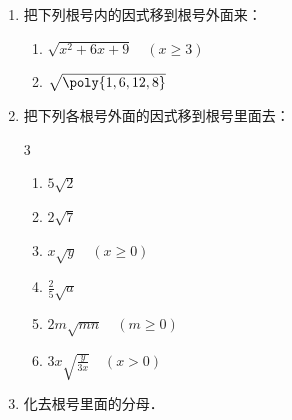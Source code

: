 \begin{ex}
\begin{enumerate}
    \item  把下列根号内的因式移到根号外面来：      
   
    \begin{enumerate}
    \item $\sqrt{x^2+6x+9}\quad (x\ge 3)$
    \item $\sqrt{\poly{1,6,12,8}}$
\end{enumerate}    
 \newpage
\item 把下列各根号外面的因式移到根号里面去：
\begin{multicols}{3}
    \begin{enumerate}
    \item $5\sqrt{2}$
    \item $2\sqrt{7}$
    \item $x\sqrt{y}\quad (x\ge 0)$
    \item $\frac{2}{5}\sqrt{a}$
    \item $2m\sqrt{mn}\quad (m\ge 0)$
    \item $3x\sqrt{\frac{y}{3x}}\quad (x>0)$
\end{enumerate}
\end{multicols}

\item 化去根号里面的分母．
\begin{enumerate}
\end{enumerate}
\end{enumerate}   
\end{ex}

